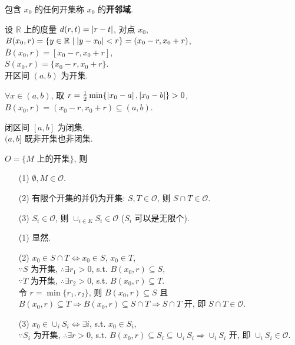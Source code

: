 \documentclass{note}
\begin{document}
\begin{df}[开邻域]
    包含 $x_0$ 的任何开集称 $x_0$ 的\textbf{开邻域}.
\end{df}

\begin{eg}
    设 $\mathbb{R}$ 上的度量 $d(r,t)=\left\lvert r-t\right\rvert$, 对点 $x_0$,\\
    $B(x_0,r)=\{y\in\mathbb{R}\mid\left\lvert y-x_0\right\rvert<r\}=(x_0-r,x_0+r)$,\\
    $\bar{B}(x_0,r)=[x_0-r,x_0+r]$,\\
    $S(x_0,r)=\{x_0-r,x_0+r\}$.\\
    开区间 $(a,b)$ 为开集.
    \begin{pf}
        $\forall x\in(a,b)$, 取 $r=\frac{1}{2}\min\{\left\lvert x_0-a\right\rvert,\left\lvert x_0-b\right\rvert\}>0$,\\
        $B(x_0,r)=(x_0-r,x_0+r)\subseteq(a,b)$.
    \end{pf}
    闭区间 $[a,b]$ 为闭集.\\
    $(a,b]$ 既非开集也非闭集.
\end{eg}

\begin{thm}[(课本定理 12.1)]
    $O=\{M\text{ 上的开集}\}$, 则
    \begin{itemize}
        \item[(1)] $\emptyset,M\in\mathcal{O}$.
        \item[(2)] 有限个开集的并仍为开集: $S,T\in\mathcal{O}$, 则 $S\cap T\in\mathcal{O}$.
        \item[(3)] $S_i\in\mathcal{O}$, 则 $\cup_{i\in K}S_i\in\mathcal{O}$ ($S_i$ 可以是无限个).
    \end{itemize}
\end{thm}
\begin{pf}
    \begin{itemize}
        \item[(1)] 显然.
        \item[(2)] $x_0\in S\cap T\Longleftrightarrow x_0\in S$, $x_0\in T$,\\
        $\because S$ 为开集, $\therefore\exists r_1>0$, s.t. $B(x_0,r)\subseteq S$,\\
        $\because T$ 为开集, $\therefore\exists r_2>0$, s.t. $B(x_0,r)\subseteq T$.\\
        令 $r=\min\{r_1,r_2\}$, 则 $B(x_0,r)\subseteq S$ 且 $B(x_0,r)\subseteq T\Longrightarrow B(x_0,r)\subseteq S\cap T\Longrightarrow S\cap T$ 开, 即 $S\cap T\in\mathcal{O}$.
        \item[(3)] $x_0\in\cup_iS_i\Longleftrightarrow\exists i$, s.t. $x_0\in S_i$,\\
        $\because S_i$ 为开集, $\therefore\exists r>0$, s.t. $B(x_0,r)\subseteq S_i\subseteq\cup_iS_i\Longrightarrow\cup_iS_i$ 开, 即 $\cup_iS_i\in\mathcal{O}$.
    \end{itemize}
\end{pf}
\end{document}
